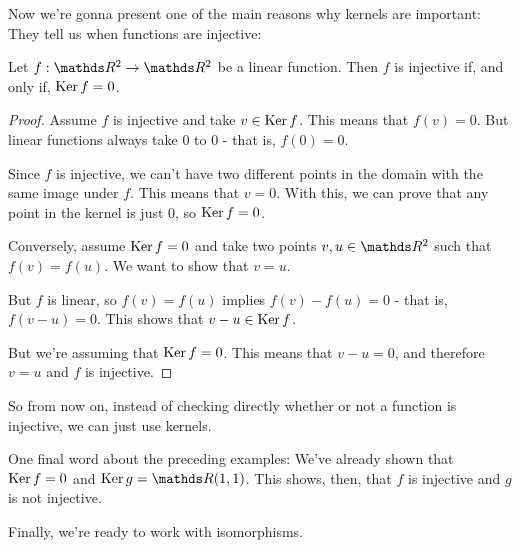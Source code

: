 Now we're gonna present one of the main reasons why kernels are important: They tell us when functions are injective:

\begin{prop}
	Let $f:\R^2\to\R^2$ be a linear function. Then $f$ is injective if, and only if, $\operatorname{Ker} f=0$.
\end{prop}
\begin{proof}
	Assume $f$ is injective and take $v\in \operatorname{Ker} f$. This means that $f(v)=0$. But linear functions always take 0 to 0 - that is, $f(0)=0$.
	
	Since $f$ is injective, we can't have two different points in the domain with the same image under $f$. This means that $v=0$. With this, we can prove that any point in the kernel is just 0, so $\operatorname{Ker} f=0$.
	
	\bigskip
	Conversely, assume $\operatorname{Ker} f=0$ and take two points $v,u\in \R^2$ such that $f(v)=f(u)$. We want to show that $v=u$.
	
	But $f$ is linear, so $f(v)=f(u)$ implies $f(v)-f(u)=0$ - that is, $f(v-u)=0$. This shows that $v-u\in\operatorname{Ker} f$.
	
	But we're assuming that $\operatorname{Ker} f=0$. This means that $v-u=0$, and therefore $v=u$ and $f$ is injective.
\end{proof}

So from now on, instead of checking directly whether or not a function is injective, we can just use kernels.

\begin{ex}
	One final word about the preceding examples: We've already shown that $\operatorname{Ker} f=0$ and $\Ker g=\R(1,1)$. This shows, then, that $f$ is injective and $g$ is not injective.
\end{ex}

Finally, we're ready to work with isomorphisms.

